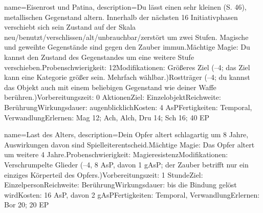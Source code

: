 {
    name={Eisenrost und Patina},
    description={Du lässt einen sehr kleinen (S. 46), metallischen Gegenstand altern. Innerhalb der nächsten 16 Initiativphasen verschiebt sich sein Zustand auf der Skala neu/benutzt/verschlissen/alt/unbrauchbar/zerstört um zwei Stufen. Magische und geweihte Gegenstände sind gegen den Zauber immun.\newline Mächtige Magie: Du kannst den Zustand des Gegenstandes um eine weitere Stufe verschieben.\newline Probenschwierigkeit: 12\newline Modifikationen: Größeres Ziel (–4; das Ziel kann eine Kategorie größer sein. Mehrfach wählbar.)\newline Rostträger (–4; du kannst das Objekt auch mit einem beliebigen Gegenstand wie deiner Waffe berühren.)\newline Vorbereitungszeit: 0 Aktionen\newline Ziel: Einzelobjekt\newline Reichweite: Berührung\newline Wirkungsdauer: augenblicklich\newline Kosten: 4 AsP\newline Fertigkeiten: Temporal, Verwandlung\newline Erlernen: Mag 12; Ach, Alch, Dru 14; Sch 16; 40 EP}
}


{
    name={Last des Alters},
    description={Dein Opfer altert schlagartig um 8 Jahre, Auswirkungen davon sind Spielleiterentscheid.\newline Mächtige Magie: Das Opfer altert um weitere 4 Jahre.\newline Probenschwierigkeit: Magieresistenz\newline Modifikationen: Verschrumpelte Glieder (–4, 8 AsP, davon 1 gAsP; der Zauber betrifft nur ein einziges Körperteil des Opfers.)\newline Vorbereitungszeit: 1 Stunde\newline Ziel: Einzelperson\newline Reichweite: Berührung\newline Wirkungsdauer: bis die Bindung gelöst wird\newline Kosten: 16 AsP, davon 2 gAsP\newline Fertigkeiten: Temporal, Verwandlung\newline Erlernen: Bor 20; 20 EP}
}


